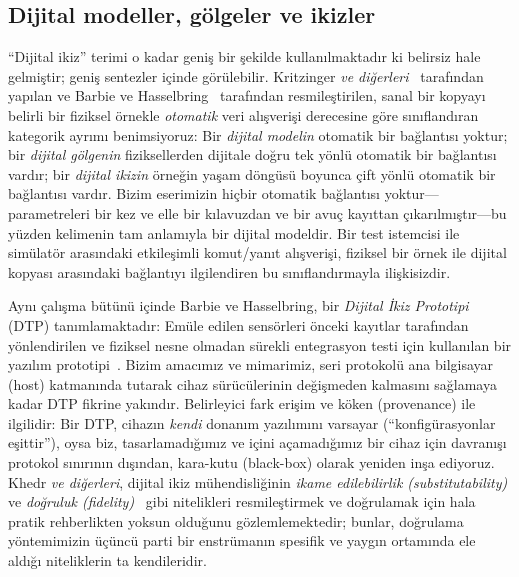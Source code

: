 \documentclass[conference]{IEEEtran}
\begin{document}
\subsection{Dijital modeller, gölgeler ve ikizler}
``Dijital ikiz'' terimi o kadar geniş bir şekilde kullanılmaktadır ki belirsiz hale gelmiştir; geniş sentezler \cite{tao2019dt,rasheed2020dt} içinde görülebilir. Kritzinger \emph{ve diğerleri}~\cite{kritzinger2018dt} tarafından yapılan ve Barbie ve Hasselbring~\cite{barbie2024dtp} tarafından resmileştirilen, sanal bir kopyayı belirli bir fiziksel örnekle \emph{otomatik} veri alışverişi derecesine göre sınıflandıran kategorik ayrımı benimsiyoruz: Bir \emph{dijital modelin} otomatik bir bağlantısı yoktur; bir \emph{dijital gölgenin} fiziksellerden dijitale doğru tek yönlü otomatik bir bağlantısı vardır; bir \emph{dijital ikizin} örneğin yaşam döngüsü boyunca çift yönlü otomatik bir bağlantısı vardır. Bizim eserimizin hiçbir otomatik bağlantısı yoktur---parametreleri bir kez ve elle bir kılavuzdan ve bir avuç kayıttan çıkarılmıştır---bu yüzden kelimenin tam anlamıyla bir dijital modeldir. Bir test istemcisi ile simülatör arasındaki etkileşimli komut/yanıt alışverişi, fiziksel bir örnek ile dijital kopyası arasındaki bağlantıyı ilgilendiren bu sınıflandırmayla ilişkisizdir.

Aynı çalışma bütünü içinde Barbie ve Hasselbring, bir \emph{Dijital İkiz Prototipi} (DTP) tanımlamaktadır: Emüle edilen sensörleri önceki kayıtlar tarafından yönlendirilen ve fiziksel nesne olmadan sürekli entegrasyon testi için kullanılan bir yazılım prototipi~\cite{barbie2024dtp,barbie2023smartfarming}. Bizim amacımız ve mimarimiz, seri protokolü ana bilgisayar (host) katmanında tutarak cihaz sürücülerinin değişmeden kalmasını sağlamaya kadar DTP fikrine yakındır. Belirleyici fark erişim ve köken (provenance) ile ilgilidir: Bir DTP, cihazın \emph{kendi} donanım yazılımını varsayar (``konfigürasyonlar eşittir''), oysa biz, tasarlamadığımız ve içini açamadığımız bir cihaz için davranışı protokol sınırının dışından, kara-kutu (black-box) olarak yeniden inşa ediyoruz. Khedr \emph{ve diğerleri}, dijital ikiz mühendisliğinin \emph{ikame edilebilirlik (substitutability)} ve \emph{doğruluk (fidelity)}~\cite{khedr2026sos} gibi nitelikleri resmileştirmek ve doğrulamak için hala pratik rehberlikten yoksun olduğunu gözlemlemektedir; bunlar, doğrulama yöntemimizin üçüncü parti bir enstrümanın spesifik ve yaygın ortamında ele aldığı niteliklerin ta kendileridir.
\end{document}

